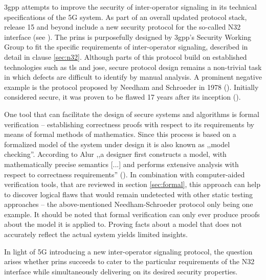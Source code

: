 \gls{3gpp} attempts to improve the security of inter-operator signaling in its technical specifications of the 5G system.
As part of an overall updated protocol stack, release 15 and beyond include a new security protocol for the so-called N32 interface (see \cite{3gpp.33.501}).
The \gls{prins} is purposefully designed by \gls{3gpp}'s Security Working Group to fit the specific requirements of inter-operator signaling, described in detail in clause \ref{sec:n32}.
Although parts of this protocol build on established technologies such as \gls{tls} and \gls{jose}, secure protocol design remains a non-trivial task in which defects are difficult to identify by manual analysis.
A prominent negative example is the protocol proposed by Needham and Schroeder in 1978 (\cite{needham1978using}).
Initially considered secure, it was proven to be flawed 17 years after its inception (\cite{lowe1996breaking}).

One tool that can facilitate the design of secure systems and algorithms is formal verification -- establishing correctness proofs with respect to its requirements by means of formal methods of mathematics.
Since this process is based on a formalized model of the system under design it is also known as ,,model checking''.
According to Alur ,,a designer first constructs a model, with mathematically precise semantics [...] and performs extensive analysis with respect to correctness requirements'' (\cite{alur2011formal}).
In combination with computer-aided verification tools, that are reviewed in section \ref{sec:formal}, this approach can help to discover logical flaws that would remain undetected with other static testing approaches -- the above-mentioned Needham-Schroeder protocol only being one example.
It should be noted that formal verification can only ever produce proofs about the model it is applied to.
Proving facts about a model that does not accurately reflect the actual system yields limited insights.

In light of 5G introducing a new inter-operator signaling protocol, the question arises whether \gls{prins} succeeds to cater to the particular requirements of the N32 interface while simultaneously delivering on its desired security properties.
